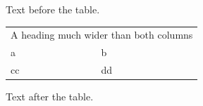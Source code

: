 \documentclass[12pt]{article}
\begin{document}
Text before the table.

\begin{tabular}{ll}\multicolumn{2}{c}{A heading much wider than both columns}\\a & b\\cc & dd\end{tabular}

Text after the table.
\end{document}
